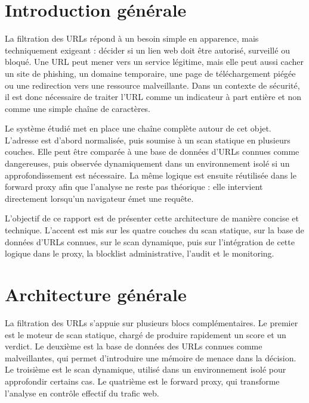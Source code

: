 ﻿\documentclass[12pt,a4paper]{report}
\newcommand{\headerstyle}{
    \fancyhf{}
    \fancyhead[L]{Filtration des URLs}
    \fancyhead[R]{USTO-MB}
    \fancyfoot[C]{\thepage}
    \renewcommand{\headrulewidth}{0.4pt}
}
\begin{document}
\pagestyle{plain}

\chapter*{Introduction générale}

La filtration des URLs répond à un besoin simple en apparence, mais techniquement exigeant : décider si un lien web doit être autorisé, surveillé ou bloqué. Une URL peut mener vers un service légitime, mais elle peut aussi cacher un site de phishing, un domaine temporaire, une page de téléchargement piégée ou une redirection vers une ressource malveillante. Dans un contexte de sécurité, il est donc nécessaire de traiter l'URL comme un indicateur à part entière et non comme une simple chaîne de caractères.

Le système étudié met en place une chaîne complète autour de cet objet. L'adresse est d'abord normalisée, puis soumise à un scan statique en plusieurs couches. Elle peut être comparée à une base de données d'URLs connues comme dangereuses, puis observée dynamiquement dans un environnement isolé si un approfondissement est nécessaire. La même logique est ensuite réutilisée dans le forward proxy afin que l'analyse ne reste pas théorique : elle intervient directement lorsqu'un navigateur émet une requête.

L'objectif de ce rapport est de présenter cette architecture de manière concise et technique. L'accent est mis sur les quatre couches du scan statique, sur la base de données d'URLs connues, sur le scan dynamique, puis sur l'intégration de cette logique dans le proxy, la blocklist administrative, l'audit et le monitoring.

\tableofcontents
\newpage

\pagestyle{fancy}
\headerstyle

\chapter{Architecture générale}

La filtration des URLs s'appuie sur plusieurs blocs complémentaires. Le premier est le moteur de scan statique, chargé de produire rapidement un score et un verdict. Le deuxième est la base de données des URLs connues comme malveillantes, qui permet d'introduire une mémoire de menace dans la décision. Le troisième est le scan dynamique, utilisé dans un environnement isolé pour approfondir certains cas. Le quatrième est le forward proxy, qui transforme l'analyse en contrôle effectif du trafic web.
\end{document}
